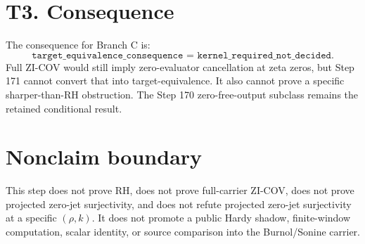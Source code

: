 \documentclass[11pt]{article}
\begin{document}
\section{T3. Consequence}

The consequence for Branch C is:
\[
  \boxed{\texttt{target\_equivalence\_consequence =
  kernel\_required\_not\_decided}.}
\]
Full ZI-COV would still imply zero-evaluator cancellation at zeta zeros, but
Step 171 cannot convert that into target-equivalence. It also cannot prove a
specific sharper-than-RH obstruction. The Step 170 zero-free-output subclass
remains the retained conditional result.

\section{Nonclaim boundary}

This step does not prove RH, does not prove full-carrier ZI-COV, does not
prove projected zero-jet surjectivity, and does not refute projected zero-jet
surjectivity at a specific \((\rho,k)\).  It does not promote a public Hardy
shadow, finite-window computation, scalar identity, or source comparison into
the Burnol/Sonine carrier.
\end{document}
